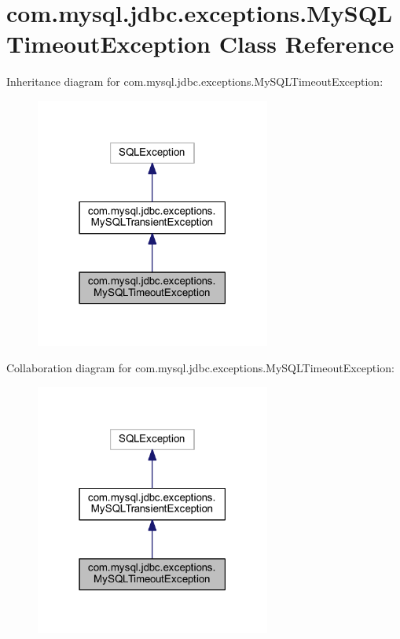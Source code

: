 \hypertarget{classcom_1_1mysql_1_1jdbc_1_1exceptions_1_1_my_s_q_l_timeout_exception}{}\section{com.\+mysql.\+jdbc.\+exceptions.\+My\+S\+Q\+L\+Timeout\+Exception Class Reference}
\label{classcom_1_1mysql_1_1jdbc_1_1exceptions_1_1_my_s_q_l_timeout_exception}


Inheritance diagram for com.\+mysql.\+jdbc.\+exceptions.\+My\+S\+Q\+L\+Timeout\+Exception\+:
\nopagebreak
\begin{figure}[H]
\begin{center}
\leavevmode
\includegraphics[width=219pt]{classcom_1_1mysql_1_1jdbc_1_1exceptions_1_1_my_s_q_l_timeout_exception__inherit__graph}
\end{center}
\end{figure}


Collaboration diagram for com.\+mysql.\+jdbc.\+exceptions.\+My\+S\+Q\+L\+Timeout\+Exception\+:
\nopagebreak
\begin{figure}[H]
\begin{center}
\leavevmode
\includegraphics[width=219pt]{classcom_1_1mysql_1_1jdbc_1_1exceptions_1_1_my_s_q_l_timeout_exception__coll__graph}
\end{center}
\end{figure}
